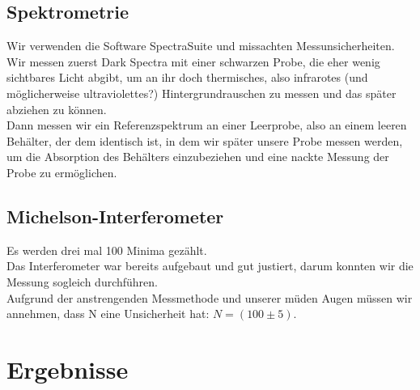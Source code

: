 \documentclass{article}
\begin{document}
\subsection{Spektrometrie}
Wir verwenden die Software SpectraSuite und missachten Messunsicherheiten. Wir messen zuerst Dark Spectra mit einer schwarzen Probe, die eher wenig sichtbares Licht abgibt, um an ihr doch thermisches, also infrarotes (und möglicherweise ultraviolettes?) Hintergrundrauschen zu messen und das später abziehen zu können. \\
Dann messen wir ein Referenzspektrum an einer Leerprobe, also an einem leeren Behälter, der dem identisch ist, in dem wir später unsere Probe messen werden, um die Absorption des Behälters einzubeziehen und eine nackte Messung der Probe zu ermöglichen.
\subsection{Michelson-Interferometer}
Es werden drei mal 100 Minima gezählt.\\
Das Interferometer war bereits aufgebaut und gut justiert, darum konnten wir die Messung sogleich durchführen.\\
Aufgrund der anstrengenden Messmethode und unserer müden Augen müssen wir annehmen, dass N eine Unsicherheit hat: $N=(100 \pm 5)$.

\section{Ergebnisse}
\end{document}
